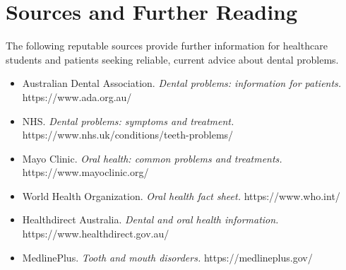 \section*{Sources and Further Reading}
The following reputable sources provide further information for healthcare students and patients seeking reliable, current advice about dental problems.

\begin{itemize}
    \item Australian Dental Association. \textit{Dental problems: information for patients.} https://www.ada.org.au/
    \item NHS. \textit{Dental problems: symptoms and treatment.} https://www.nhs.uk/conditions/teeth-problems/
    \item Mayo Clinic. \textit{Oral health: common problems and treatments.} https://www.mayoclinic.org/
    \item World Health Organization. \textit{Oral health fact sheet.} https://www.who.int/
    \item Healthdirect Australia. \textit{Dental and oral health information.} https://www.healthdirect.gov.au/
    \item MedlinePlus. \textit{Tooth and mouth disorders.} https://medlineplus.gov/
\end{itemize}
